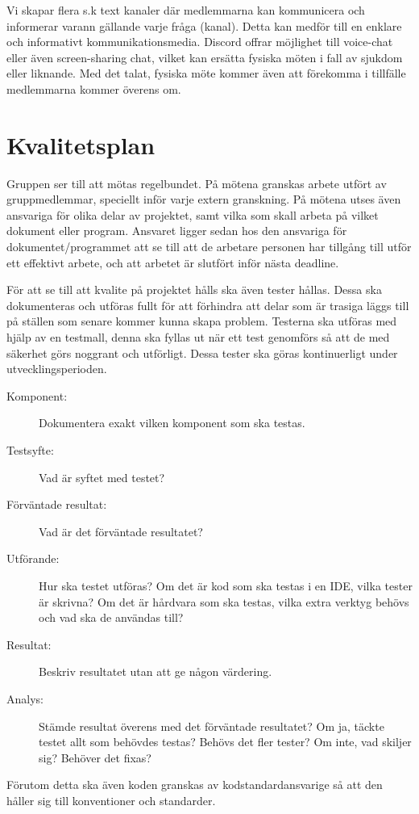 \documentclass[a4paper]{article}
\begin{document}
Vi skapar flera s.k text kanaler där medlemmarna kan kommunicera och informerar varann gällande varje
fråga (kanal). Detta kan medför till en enklare och informativt kommunikationsmedia. Discord
offrar möjlighet till voice-chat eller även screen-sharing chat, vilket kan ersätta fysiska möten 
i fall av sjukdom eller liknande. Med det talat, fysiska möte kommer även att förekomma i tillfälle medlemmarna kommer överens om. 



\section{Kvalitetsplan}
Gruppen ser till att mötas regelbundet. På mötena granskas arbete utfört av gruppmedlemmar, speciellt inför varje extern granskning. På mötena utses även ansvariga för olika delar av projektet, samt vilka som skall arbeta på vilket dokument eller program. Ansvaret ligger sedan hos den ansvariga för dokumentet/programmet att se till att de arbetare personen har tillgång till utför ett effektivt arbete, och att arbetet är slutfört inför nästa deadline.

För att se till att kvalite på projektet hålls ska även tester hållas. Dessa ska dokumenteras och utföras fullt för att förhindra att delar som är trasiga läggs till på ställen som senare kommer kunna skapa problem. Testerna ska utföras med hjälp av en testmall, denna ska fyllas ut när ett test genomförs så att de med säkerhet görs noggrant och utförligt. Dessa tester ska göras kontinuerligt under utvecklingsperioden.
\begin{description}
\item[Komponent:] 
Dokumentera exakt vilken komponent som ska testas.

\item[Testsyfte:] Vad är syftet med testet?

\item[Förväntade resultat:] Vad är det förväntade resultatet?

\item[Utförande:] Hur ska testet utföras? Om det är kod som ska testas i en IDE, vilka tester är skrivna? Om det är hårdvara som ska testas, vilka extra verktyg behövs och vad ska de användas till?

\item[Resultat:] Beskriv resultatet utan att ge någon värdering.

\item[Analys:] Stämde resultat överens med det förväntade resultatet? Om ja, täckte testet allt som behövdes testas? Behövs det fler tester? Om inte, vad skiljer sig? Behöver det fixas?
\end{description}
Förutom detta ska även koden granskas av kodstandardansvarige så att den håller sig till konventioner och standarder.
\end{document}
